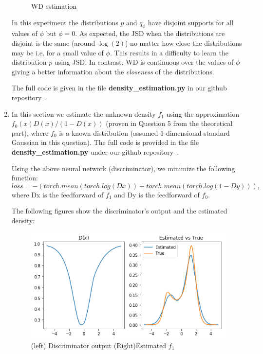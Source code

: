 \begin{enumerate}
\begin{figure}[H]
		\caption{WD estimation}
		\label{fig:wd}
	\end{figure}
	In this experiment the distributions $p$ and $q_\phi$ have disjoint supports for all values of $\phi$ but $\phi=0$. 
	As expected, the JSD when the distributions are disjoint is the same (around $\log(2)$) no matter how close the distributions may be i.e. for a small value of $\phi$. This results in a difficulty to learn the distribution $p$ using JSD. In contrast, WD is continuous over the values of $\phi$ giving a better information about the \emph{closeness} of the distributions.
	
	The full code is given in the file \textbf{density\_estimation.py} in our github repository~\cite{github}.

\item In this section we estimate the unknown density $f_1$ using the approximation ${f_0(x){D(x)}/(1-D(x))}$ (proven in Question 5 from the theoretical part), where $f_0$ is a known distribution (assumed 1-dimensional standard Gaussian in this question). The full code is provided in the file \textbf{density\_estimation.py} under our github repository~\cite{github}.

Using the above neural network (discriminator), we minimize the following function:
$$loss = -(torch.mean(torch.log(Dx)) + torch.mean(torch.log(1-Dy))),$$
where Dx is the feedforward of $f_1$ and Dy is the feedforward of $f_0$. 

The following figures show the discriminator's output and the estimated density:

\begin{figure}[H]
	\centering
	\includegraphics[scale=0.8]{disc.png}
	\caption{(left) Discriminator output (Right)Estimated $f_1$}
	\label{fig:disc}
\end{figure}



\end{enumerate}

